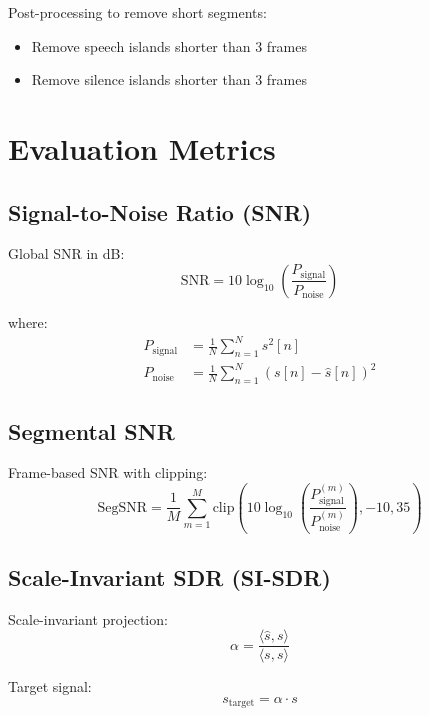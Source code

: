 \documentclass[12pt,a4paper]{article}
\begin{document}
Post-processing to remove short segments:
\begin{itemize}
    \item Remove speech islands shorter than 3 frames
    \item Remove silence islands shorter than 3 frames
\end{itemize}

\section{Evaluation Metrics}

\subsection{Signal-to-Noise Ratio (SNR)}

Global SNR in dB:
\begin{equation}
\text{SNR} = 10 \log_{10} \left(\frac{P_{\text{signal}}}{P_{\text{noise}}}\right)
\end{equation}

where:
\begin{align}
P_{\text{signal}} &= \frac{1}{N} \sum_{n=1}^{N} s^2[n] \\
P_{\text{noise}} &= \frac{1}{N} \sum_{n=1}^{N} (s[n] - \hat{s}[n])^2
\end{align}

\subsection{Segmental SNR}

Frame-based SNR with clipping:
\begin{equation}
\text{SegSNR} = \frac{1}{M} \sum_{m=1}^{M} \text{clip}\left(10 \log_{10} \left(\frac{P_{\text{signal}}^{(m)}}{P_{\text{noise}}^{(m)}}\right), -10, 35\right)
\end{equation}

\subsection{Scale-Invariant SDR (SI-SDR)}

Scale-invariant projection:
\begin{equation}
\alpha = \frac{\langle \hat{s}, s \rangle}{\langle s, s \rangle}
\end{equation}

Target signal:
\begin{equation}
s_{\text{target}} = \alpha \cdot s
\end{equation}
\end{document}

